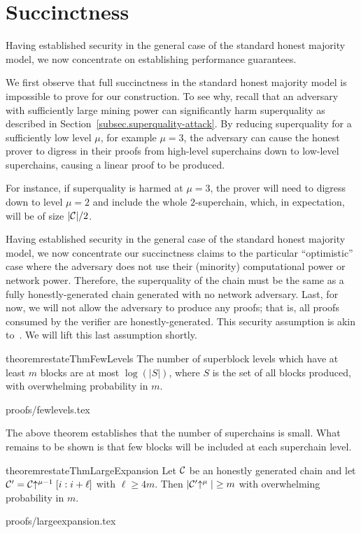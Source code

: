 \section{Succinctness}
\label{sec.succinctness}
Having established security in the general case of the standard honest majority
model, we now concentrate on establishing performance guarantees.

We first observe that full succinctness in the standard honest majority model is
impossible to prove for our construction. To see why, recall that an adversary
with sufficiently large mining power can significantly harm superquality as
described in Section~\ref{subsec.superquality-attack}. By reducing
superquality for a sufficiently low level $\mu$, for example $\mu = 3$, the
adversary can cause the honest prover to digress in their proofs from high-level
superchains down to low-level superchains, causing a linear proof to be
produced.

For instance, if superquality is harmed at $\mu = 3$, the prover will
need to digress down to level $\mu = 2$ and include the whole $2$-superchain,
which, in expectation, will be of size $|\mathcal{C}|/2$.

Having established security in the general case of the standard honest majority
model, we now concentrate our succinctness claims to the particular
``optimistic'' case where the adversary does not use their (minority)
computational power or network power. Therefore, the superquality of the chain
must be the same as a fully honestly-generated chain generated with no network
adversary. Last, for now, we will not allow the adversary to produce any proofs;
that is, all proofs consumed by the verifier are honestly-generated. This
security assumption is akin to~\cite{KLS}. We will lift this last assumption
shortly.

\begin{restatable}{theorem}{restateThmFewLevels}
    \label{thm.few-levels}
    The number of superblock levels which have at least $m$ blocks are at most
    $\log(|S|)$, where $S$ is the set of all blocks produced, with overwhelming
    probability in $m$.
\end{restatable}
{proofs/fewlevels.tex}

The above theorem establishes that the number of superchains is small. What
remains to be shown is that few blocks will be included at each superchain
level.

\begin{restatable}{theorem}{restateThmLargeExpansion}
    \label{thm.large-expansion}
    Let $\mathcal{C}$ be an honestly generated chain and let
    $\mathcal{C}' = \mathcal{C}\negthickspace\uparrow^{\mu - 1}[i:i + \ell]$ with $\ell \geq 4m$.
    Then $|\mathcal{C}'\negthickspace\uparrow^\mu| \geq m$
    with overwhelming probability in $m$.
\end{restatable}
{proofs/largeexpansion.tex}

